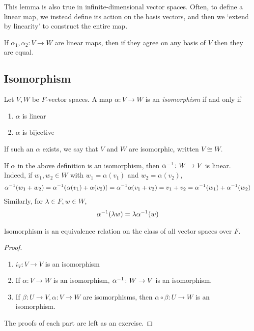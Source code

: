 \begin{remark}
    This lemma is also true in infinite-dimensional vector spaces.
    Often, to define a linear map, we instead define its action on the basis vectors, and then we `extend by linearity' to construct the entire map.
\end{remark}
\begin{remark}
    If $\alpha_1, \alpha_2 \colon V \to W$ are linear maps, then if they agree on any basis of $V$ then they are equal.
\end{remark}

\subsection{Isomorphism}
\begin{definition}
    Let $V, W$ be $F$-vector spaces.
    A map $\alpha \colon V \to W$ is an \textit{isomorphism} if and only if
    \begin{enumerate}
        \item $\alpha$ is linear
        \item $\alpha$ is bijective
    \end{enumerate}
    If such an $\alpha$ exists, we say that $V$ and $W$ are isomorphic, written $V \cong W$.
\end{definition}
\begin{remark}
    If $\alpha$ in the above definition is an isomorphism, then $\alpha^{-1} \colon W \to V$ is linear.
    Indeed, if $w_1, w_2 \in W$ with $w_1 = \alpha(v_1)$ and $w_2 = \alpha(v_2)$,
    \begin{align*}
        \alpha^{-1} (w_1 + w_2) = \alpha^{-1} (\alpha(v_1) + \alpha(v_2)) = \alpha^{-1} \alpha (v_1 + v_2) = v_1 + v_2 = \alpha^{-1}(w_1) + \alpha^{-1}(w_2)
    \end{align*}
    Similarly, for $\lambda \in F, w \in W$,
    \begin{align*}
        \alpha^{-1}(\lambda w) = \lambda \alpha^{-1}(w)
    \end{align*}
\end{remark}
\begin{lemma}
    Isomorphism is an equivalence relation on the class of all vector spaces over $F$.
\end{lemma}
\begin{proof}
    \begin{enumerate}
        \item $i_V \colon V \to V$ is an isomorphism
        \item If $\alpha \colon V \to W$ is an isomorphism, $\alpha^{-1} \colon W \to V$ is an isomorphism.
        \item If $\beta \colon U \to V, \alpha \colon V \to W$ are isomorphisms, then $\alpha \circ \beta \colon U \to W$ is an isomorphism.
    \end{enumerate}
    The proofs of each part are left as an exercise.
\end{proof}
